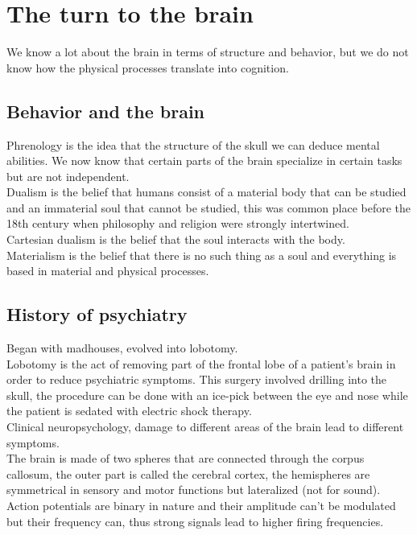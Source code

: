 \documentclass[11pt]{article}
\begin{document}
	\thispagestyle{empty}
	\tableofcontents
	
	\newpage
	\setcounter{page}{1}
	\section{The turn to the brain}
	We know a lot about the brain in terms of structure and behavior, but we do not know how the physical processes translate into cognition.\\
	\subsection{Behavior and the brain}
	Phrenology is the idea that the structure of the skull we can deduce mental abilities. We now know that certain parts of the brain specialize in certain tasks but are not independent.\\
	Dualism is the belief that humans consist of a material body that can be studied and an immaterial soul that cannot be studied, this was common place before the 18th century when philosophy and religion were strongly intertwined.\\
	Cartesian dualism is the belief that the soul interacts with the body.\\
	Materialism is the belief that there is no such thing as a soul and everything is based in material and physical processes.
	\subsection{History of psychiatry}
	Began with madhouses, evolved into lobotomy.\\
	Lobotomy is the act of removing part of the frontal lobe of a patient's brain in order to reduce psychiatric symptoms. This surgery involved drilling into the skull, the procedure can be done with an ice-pick between the eye and nose while the patient is sedated with electric shock therapy.\\
	Clinical neuropsychology, damage to different areas of the brain lead to different symptoms.\\
	The brain is made of two spheres that are connected through the corpus callosum, the outer part is called the cerebral cortex, the hemispheres are symmetrical in sensory and motor functions but lateralized (not for sound).\\
	Action potentials are binary in nature and their amplitude can't be modulated but their frequency can, thus strong signals lead to higher firing frequencies.
	
\end{document}
